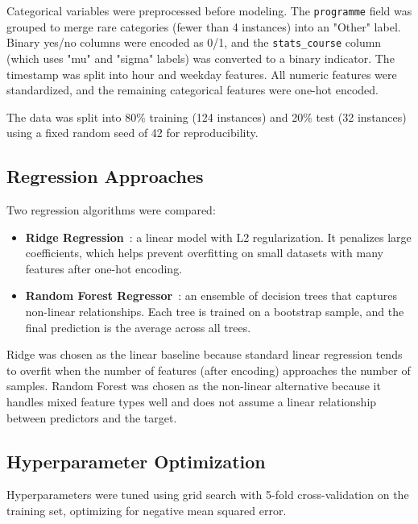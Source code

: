 \documentclass[runningheads]{llncs}
\begin{document}
Categorical variables were preprocessed before modeling. The \texttt{programme} field was grouped to merge rare categories (fewer than 4 instances) into an "Other" label. Binary yes/no columns were encoded as 0/1, and the \texttt{stats\_course} column (which uses "mu" and "sigma" labels) was converted to a binary indicator. The timestamp was split into hour and weekday features. All numeric features were standardized, and the remaining categorical features were one-hot encoded.

The data was split into 80\% training (124 instances) and 20\% test (32 instances) using a fixed random seed of 42 for reproducibility.

\subsection*{Regression Approaches}

Two regression algorithms were compared:

\begin{itemize}
    \item \textbf{Ridge Regression}~\cite{hoerl_1970}: a linear model with L2 regularization. It penalizes large coefficients, which helps prevent overfitting on small datasets with many features after one-hot encoding.
    \item \textbf{Random Forest Regressor}~\cite{breiman_2001}: an ensemble of decision trees that captures non-linear relationships. Each tree is trained on a bootstrap sample, and the final prediction is the average across all trees.
\end{itemize}

Ridge was chosen as the linear baseline because standard linear regression tends to overfit when the number of features (after encoding) approaches the number of samples. Random Forest was chosen as the non-linear alternative because it handles mixed feature types well and does not assume a linear relationship between predictors and the target.

\subsection*{Hyperparameter Optimization}

Hyperparameters were tuned using grid search with 5-fold cross-validation on the training set, optimizing for negative mean squared error.
\end{document}

